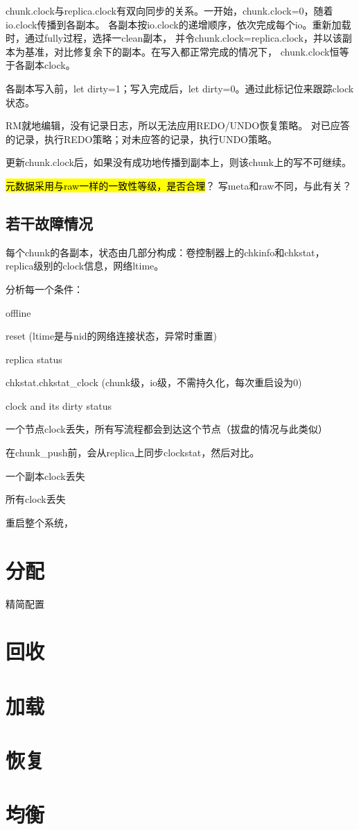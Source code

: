 chunk.clock与replica.clock有双向同步的关系。一开始，chunk.clock=0，随着io.clock传播到各副本。
各副本按io.clock的递增顺序，依次完成每个io。重新加载时，通过fully过程，选择一clean副本，
并令chunk.clock=replica.clock，并以该副本为基准，对比修复余下的副本。在写入都正常完成的情况下，
chunk.clock恒等于各副本clock。

各副本写入前，let dirty=1；写入完成后，let dirty=0。通过此标记位来跟踪clock状态。

RM就地编辑，没有记录日志，所以无法应用REDO/UNDO恢复策略。
对已应答的记录，执行REDO策略；对未应答的记录，执行UNDO策略。

更新chunk.clock后，如果没有成功地传播到副本上，则该chunk上的写不可继续。

\hl{元数据采用与raw一样的一致性等级，是否合理}？ 写meta和raw不同，与此有关？

\subsection{若干故障情况}

每个chunk的各副本，状态由几部分构成：卷控制器上的chkinfo和chkstat，
replica级别的clock信息，网络ltime。

分析每一个条件：
\begin{compactenum}
\item offline
\item reset (ltime是与nid的网络连接状态，异常时重置)
\item replica status
\item chkstat.chkstat\_clock (chunk级，io级，不需持久化，每次重启设为0)
\item clock and its dirty status
\end{compactenum}

一个节点clock丢失，所有写流程都会到达这个节点（拔盘的情况与此类似）

在chunk\_push前，会从replica上同步clockstat，然后对比。

一个副本clock丢失

所有clock丢失

重启整个系统，

\section{分配}

精简配置

\section{回收}

\section{加载}

\section{恢复}

\section{均衡}
